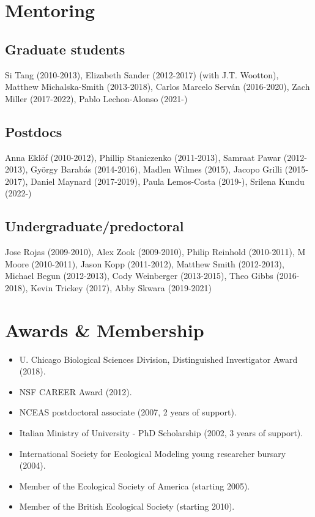 \documentclass[10,letter,]{awesome-cv}
\providecommand{\tightlist}{%
	\setlength{\itemsep}{0pt}\setlength{\parskip}{0pt}}
\begin{document}
\hypertarget{mentoring}{%
\section{Mentoring}\label{mentoring}}

\hypertarget{graduate-students}{%
\subsection{Graduate students}\label{graduate-students}}

Si Tang (2010-2013), Elizabeth Sander (2012-2017) (with J.T. Wootton),
Matthew Michalska-Smith (2013-2018), Carlos Marcelo Serván (2016-2020),
Zach Miller (2017-2022), Pablo Lechon-Alonso (2021-)

\hypertarget{postdocs}{%
\subsection{Postdocs}\label{postdocs}}

Anna Eklöf (2010-2012), Phillip Staniczenko (2011-2013), Samraat Pawar
(2012-2013), György Barabás (2014-2016), Madlen Wilmes (2015), Jacopo
Grilli (2015-2017), Daniel Maynard (2017-2019), Paula Lemos-Costa
(2019-), Srilena Kundu (2022-)

\hypertarget{undergraduatepredoctoral}{%
\subsection{Undergraduate/predoctoral}\label{undergraduatepredoctoral}}

Jose Rojas (2009-2010), Alex Zook (2009-2010), Philip Reinhold
(2010-2011), M Moore (2010-2011), Jason Kopp (2011-2012), Matthew Smith
(2012-2013), Michael Begun (2012-2013), Cody Weinberger (2013-2015),
Theo Gibbs (2016-2018), Kevin Trickey (2017), Abby Skwara (2019-2021)

\hypertarget{awards-membership}{%
\section{Awards \& Membership}\label{awards-membership}}

\begin{itemize}
\tightlist
\item
  U. Chicago Biological Sciences Division, Distinguished Investigator
  Award (2018).
\item
  NSF CAREER Award (2012).
\item
  NCEAS postdoctoral associate (2007, 2 years of support).
\item
  Italian Ministry of University - PhD Scholarship (2002, 3 years of
  support).
\item
  International Society for Ecological Modeling young researcher bursary
  (2004).
\item
  Member of the Ecological Society of America (starting 2005).
\item
  Member of the British Ecological Society (starting 2010).
\end{itemize}
\end{document}
